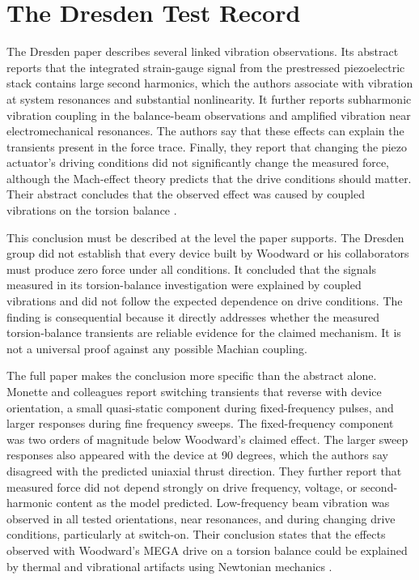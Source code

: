 \documentclass[11pt]{article}
\begin{document}
\section{The Dresden Test Record}

The Dresden paper describes several linked vibration observations. Its abstract reports that the integrated strain-gauge signal from the prestressed piezoelectric stack contains large second harmonics, which the authors associate with vibration at system resonances and substantial nonlinearity. It further reports subharmonic vibration coupling in the balance-beam observations and amplified vibration near electromechanical resonances. The authors say that these effects can explain the transients present in the force trace. Finally, they report that changing the piezo actuator's driving conditions did not significantly change the measured force, although the Mach-effect theory predicts that the drive conditions should matter. Their abstract concludes that the observed effect was caused by coupled vibrations on the torsion balance \cite{Monette2021}.

This conclusion must be described at the level the paper supports. The Dresden group did not establish that every device built by Woodward or his collaborators must produce zero force under all conditions. It concluded that the signals measured in its torsion-balance investigation were explained by coupled vibrations and did not follow the expected dependence on drive conditions. The finding is consequential because it directly addresses whether the measured torsion-balance transients are reliable evidence for the claimed mechanism. It is not a universal proof against any possible Machian coupling.

The full paper makes the conclusion more specific than the abstract alone. Monette and colleagues report switching transients that reverse with device orientation, a small quasi-static component during fixed-frequency pulses, and larger responses during fine frequency sweeps. The fixed-frequency component was two orders of magnitude below Woodward's claimed effect. The larger sweep responses also appeared with the device at 90 degrees, which the authors say disagreed with the predicted uniaxial thrust direction. They further report that measured force did not depend strongly on drive frequency, voltage, or second-harmonic content as the model predicted. Low-frequency beam vibration was observed in all tested orientations, near resonances, and during changing drive conditions, particularly at switch-on. Their conclusion states that the effects observed with Woodward's MEGA drive on a torsion balance could be explained by thermal and vibrational artifacts using Newtonian mechanics \cite{Monette2021}.
\end{document}
